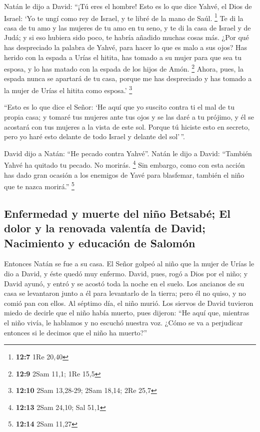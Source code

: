  Natán le dijo a David: ``¡Tú eres el hombre! Esto es lo
que dice Yahvé, el Dios de Israel: `Yo te ungí como rey de Israel, y te
libré de la mano de Saúl. \footnote{\textbf{12:7} 1Re 20,40}
 Te di la casa de tu amo y las mujeres de tu amo en tu
seno, y te di la casa de Israel y de Judá; y si eso hubiera sido poco,
te habría añadido muchas cosas más.  ¿Por qué has
despreciado la palabra de Yahvé, para hacer lo que es malo a sus ojos?
Has herido con la espada a Urías el hitita, has tomado a su mujer para
que sea tu esposa, y lo has matado con la espada de los hijos de Amón.
\footnote{\textbf{12:9} 2Sam 11,1; 1Re 15,5}  Ahora,
pues, la espada nunca se apartará de tu casa, porque me has despreciado
y has tomado a la mujer de Urías el hitita como esposa.' \footnote{\textbf{12:10}
  2Sam 13,28-29; 2Sam 18,14; 2Re 25,7}

 ``Esto es lo que dice el Señor: `He aquí que yo suscito
contra ti el mal de tu propia casa; y tomaré tus mujeres ante tus ojos y
se las daré a tu prójimo, y él se acostará con tus mujeres a la vista de
este sol.  Porque tú hiciste esto en secreto, pero yo
haré esto delante de todo Israel y delante del sol'\,''.

 David dijo a Natán: ``He pecado contra Yahvé''. Natán le
dijo a David: ``También Yahvé ha quitado tu pecado. No morirás.
\footnote{\textbf{12:13} 2Sam 24,10; Sal 51,1}  Sin
embargo, como con esta acción has dado gran ocasión a los enemigos de
Yavé para blasfemar, también el niño que te nazca morirá.'' \footnote{\textbf{12:14}
  2Sam 11,27}

\hypertarget{enfermedad-y-muerte-del-niuxf1o-betsabuxe9-el-dolor-y-la-renovada-valentuxeda-de-david-nacimiento-y-educaciuxf3n-de-salomuxf3n}{%
\subsection{Enfermedad y muerte del niño Betsabé; El dolor y la renovada
valentía de David; Nacimiento y educación de
Salomón}\label{enfermedad-y-muerte-del-niuxf1o-betsabuxe9-el-dolor-y-la-renovada-valentuxeda-de-david-nacimiento-y-educaciuxf3n-de-salomuxf3n}}

 Entonces Natán se fue a su casa. El Señor golpeó al niño
que la mujer de Urías le dio a David, y éste quedó muy enfermo.
 David, pues, rogó a Dios por el niño; y David ayunó, y
entró y se acostó toda la noche en el suelo.  Los
ancianos de su casa se levantaron junto a él para levantarlo de la
tierra; pero él no quiso, y no comió pan con ellos.  Al
séptimo día, el niño murió. Los siervos de David tuvieron miedo de
decirle que el niño había muerto, pues dijeron: ``He aquí que, mientras
el niño vivía, le hablamos y no escuchó nuestra voz. ¿Cómo se va a
perjudicar entonces si le decimos que el niño ha muerto?''


